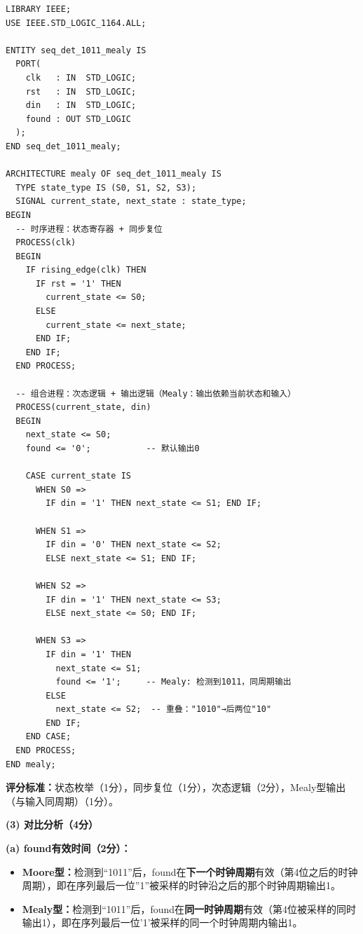 \begin{lstlisting}[caption={Mealy型``1011''序列检测器VHDL代码}]
LIBRARY IEEE;
USE IEEE.STD_LOGIC_1164.ALL;

ENTITY seq_det_1011_mealy IS
  PORT(
    clk   : IN  STD_LOGIC;
    rst   : IN  STD_LOGIC;
    din   : IN  STD_LOGIC;
    found : OUT STD_LOGIC
  );
END seq_det_1011_mealy;

ARCHITECTURE mealy OF seq_det_1011_mealy IS
  TYPE state_type IS (S0, S1, S2, S3);
  SIGNAL current_state, next_state : state_type;
BEGIN
  -- 时序进程：状态寄存器 + 同步复位
  PROCESS(clk)
  BEGIN
    IF rising_edge(clk) THEN
      IF rst = '1' THEN
        current_state <= S0;
      ELSE
        current_state <= next_state;
      END IF;
    END IF;
  END PROCESS;

  -- 组合进程：次态逻辑 + 输出逻辑（Mealy：输出依赖当前状态和输入）
  PROCESS(current_state, din)
  BEGIN
    next_state <= S0;
    found <= '0';           -- 默认输出0

    CASE current_state IS
      WHEN S0 =>
        IF din = '1' THEN next_state <= S1; END IF;

      WHEN S1 =>
        IF din = '0' THEN next_state <= S2;
        ELSE next_state <= S1; END IF;

      WHEN S2 =>
        IF din = '1' THEN next_state <= S3;
        ELSE next_state <= S0; END IF;

      WHEN S3 =>
        IF din = '1' THEN
          next_state <= S1;
          found <= '1';     -- Mealy: 检测到1011，同周期输出
        ELSE
          next_state <= S2;  -- 重叠："1010"→后两位"10"
        END IF;
    END CASE;
  END PROCESS;
END mealy;
\end{lstlisting}

\textbf{评分标准：}状态枚举（1分），同步复位（1分），次态逻辑（2分），Mealy型输出（与输入同周期）（1分）。

\vspace{0.3cm}

\textbf{(3) 对比分析（4分）}

\textbf{(a) found有效时间（2分）：}
\begin{itemize}
  \item \textbf{Moore型：}检测到``1011''后，found在\textbf{下一个时钟周期}有效（第4位之后的时钟周期），即在序列最后一位''1''被采样的时钟沿之后的那个时钟周期输出1。
  \item \textbf{Mealy型：}检测到``1011''后，found在\textbf{同一时钟周期}有效（第4位被采样的同时输出1），即在序列最后一位'1'被采样的同一个时钟周期内输出1。
\end{itemize}


